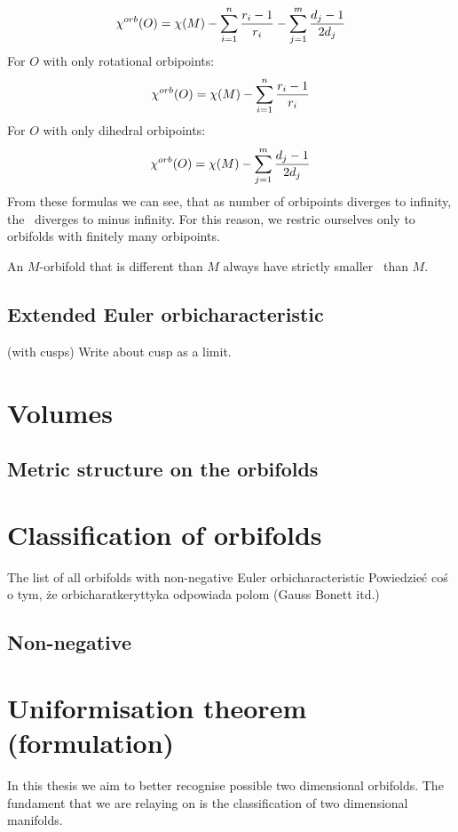 \begin{equation}\label{chi orb expression}
{\chi^{orb}(O)} = \chi (M) - \sum_{i=1}^n \frac{r_i-1}{r_i} - \sum_{j=1}^m \frac{d_j-1}{2d_j}
\end{equation}
For $O$ with only rotational orbipoints:
\begin{equation}\label{chi orb expression rotational}
{\chi^{orb}(O)} = \chi (M) - \sum_{i=1}^n \frac{r_i-1}{r_i}
\end{equation}
For $O$ with only dihedral orbipoints:
\begin{equation}\label{chi orb expression dihedral}
{\chi^{orb}(O)} = \chi (M) - \sum_{j=1}^m \frac{d_j-1}{2d_j}
\end{equation}
From these formulas we can see, that as number of orbipoints diverges to infinity, the \Eoc\ 
diverges to minus infinity. For this reason, we restric ourselves only to orbifolds 
with finitely many orbipoints.
\begin{observation}\label{orbifolds have smaller Eoc than their base manifolds}
An $M$-orbifold that is different than $M$ always have strictly smaller \Eoc\ than $M$. 
\end{observation}

\subsection{Extended Euler orbicharacteristic}\label{extended_Euler_orbicharacteristic} (with cusps)
Write about cusp as a limit.
\section{Volumes}
\subsection{Metric structure on the orbifolds}

\section{Classification of orbifolds}
The list of all orbifolds with non-negative Euler orbicharacteristic
Powiedzieć coś o tym, że orbicharatkeryttyka odpowiada polom (Gauss Bonett itd.)
\cite{}
\subsection{Non-negative \Eoc}


\section{Uniformisation theorem (formulation)}
In this thesis we aim to better recognise possible two dimensional orbifolds. 
The fundament that we are relaying on is the classification of two dimensional manifolds. 

